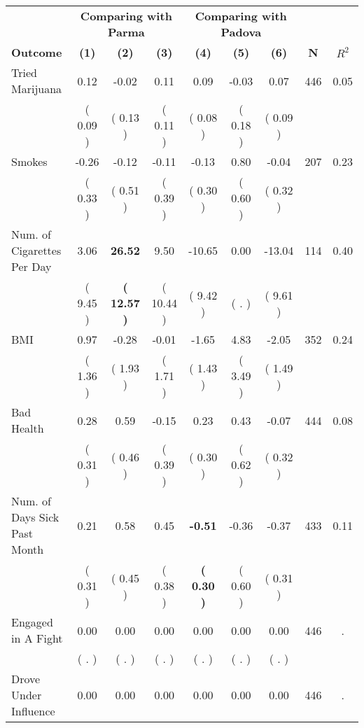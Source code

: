 \begin{tabular}{lcccccccc}
\toprule
 & \multicolumn{3}{c}{\textbf{Comparing with Parma}} & \multicolumn{3}{c}{\textbf{Comparing with Padova}} & \\
\cmidrule(lr){2-4} \cmidrule(lr){5-7} 
 \textbf{Outcome} & \textbf{(1)} & \textbf{(2)} & \textbf{(3)} & \textbf{(4)} & \textbf{(5)} & \textbf{(6)} & \textbf{N} & \textbf{$ R^2$} \\
\midrule
Tried Marijuana &      0.12 &     -0.02 &      0.11 &      0.09 &     -0.03 &      0.07 & 446 &       0.05 \\ 
 & (     0.09 ) & (     0.13 ) & (     0.11 ) & (     0.08 ) & (     0.18 ) & (     0.09 ) & \\
Smokes &     -0.26 &     -0.12 &     -0.11 &     -0.13 &      0.80 &     -0.04 & 207 &       0.23 \\ 
 & (     0.33 ) & (     0.51 ) & (     0.39 ) & (     0.30 ) & (     0.60 ) & (     0.32 ) & \\
Num. of Cigarettes Per Day &      3.06 & \textbf{    26.52} &      9.50 &    -10.65 &      0.00 &    -13.04 & 114 &       0.40 \\ 
 & (     9.45 ) & \textbf{(    12.57 )} & (    10.44 ) & (     9.42 ) & (        . ) & (     9.61 ) & \\
BMI &      0.97 &     -0.28 &     -0.01 &     -1.65 &      4.83 &     -2.05 & 352 &       0.24 \\ 
 & (     1.36 ) & (     1.93 ) & (     1.71 ) & (     1.43 ) & (     3.49 ) & (     1.49 ) & \\
Bad Health &      0.28 &      0.59 &     -0.15 &      0.23 &      0.43 &     -0.07 & 444 &       0.08 \\ 
 & (     0.31 ) & (     0.46 ) & (     0.39 ) & (     0.30 ) & (     0.62 ) & (     0.32 ) & \\
Num. of Days Sick Past Month &      0.21 &      0.58 &      0.45 & \textbf{    -0.51} &     -0.36 &     -0.37 & 433 &       0.11 \\ 
 & (     0.31 ) & (     0.45 ) & (     0.38 ) & \textbf{(     0.30 )} & (     0.60 ) & (     0.31 ) & \\
Engaged in A Fight &      0.00 &      0.00 &      0.00 &      0.00 &      0.00 &      0.00 & 446 &          . \\ 
 & (        . ) & (        . ) & (        . ) & (        . ) & (        . ) & (        . ) & \\
Drove Under Influence &      0.00 &      0.00 &      0.00 &      0.00 &      0.00 &      0.00 & 446 &          . \\ 

\end{tabular}
